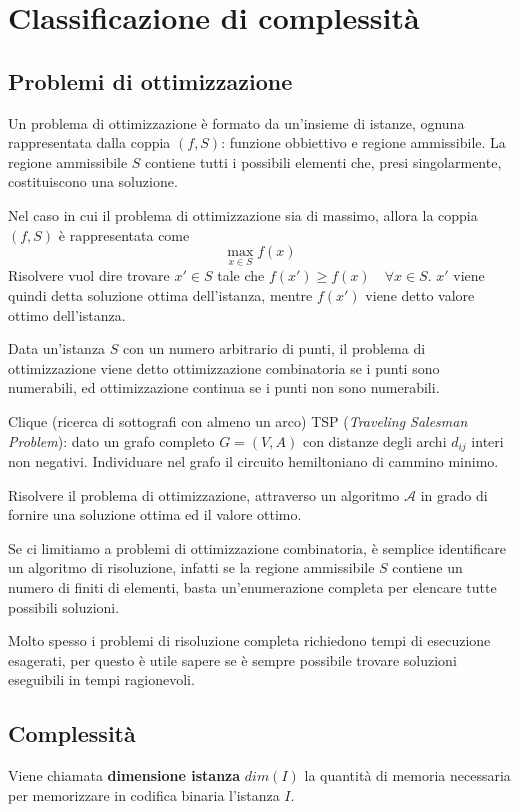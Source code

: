 \documentclass[../template]{subfiles}
\begin{document}
\section{Classificazione di complessità}
\subsection{Problemi di ottimizzazione}
Un problema di ottimizzazione è formato da un'insieme di istanze, ognuna rappresentata dalla coppia $(f, S)$: funzione obbiettivo e regione ammissibile.
La regione ammissibile $S$ contiene tutti i possibili elementi che, presi singolarmente, costituiscono una soluzione.

Nel caso in cui il problema di ottimizzazione sia di massimo, allora la coppia $(f, S)$ è rappresentata come
\[
    \max_{x\in S} f(x)
\]
Risolvere vuol dire trovare $x' \in S$ tale che $f(x') \ge f(x) \quad \forall x \in S$.
$x'$ viene quindi detta soluzione ottima dell'istanza, mentre $f(x')$ viene detto valore ottimo dell'istanza.

Data un'istanza $S$ con un numero arbitrario di punti, il problema di ottimizzazione viene detto ottimizzazione combinatoria se i punti sono numerabili, ed ottimizzazione continua se i punti non sono numerabili.

Clique (ricerca di sottografi con almeno un arco)
TSP (\textit{Traveling Salesman Problem}): dato un grafo completo $G=(V, A)$ con distanze degli archi $d_{ij}$ interi non negativi. Individuare nel grafo il circuito hemiltoniano di cammino minimo.

Risolvere il problema di ottimizzazione, attraverso un algoritmo $\mathcal{A}$ in grado di fornire una soluzione ottima ed il valore ottimo.

Se ci limitiamo a problemi di ottimizzazione combinatoria, è semplice identificare un algoritmo di risoluzione, infatti se la regione ammissibile $S$ contiene un numero di finiti di elementi, basta un'enumerazione completa per elencare tutte possibili soluzioni.

Molto spesso i problemi di risoluzione completa richiedono tempi di esecuzione esagerati, per questo è utile sapere se è sempre possibile trovare soluzioni eseguibili in tempi ragionevoli.

\subsection{Complessità}
Viene chiamata \textbf{dimensione istanza} $dim(I)$ la quantità di memoria necessaria per memorizzare in codifica binaria l'istanza $I$.
\end{document}
